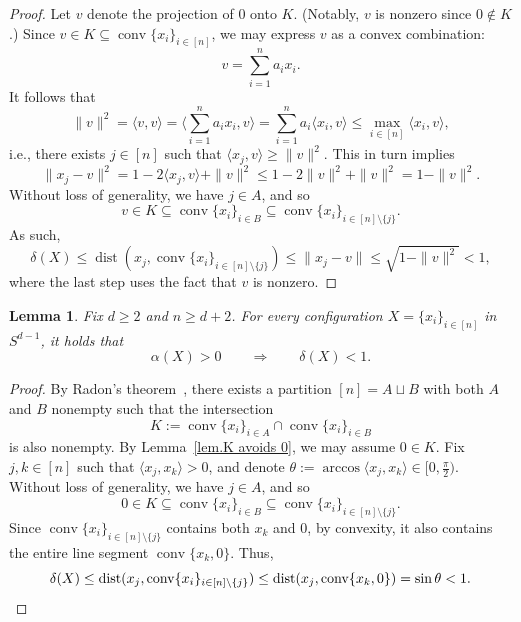 \documentclass{article}
\theoremstyle{plain}
\newtheorem{lemma}[theorem]{Lemma}
\theoremstyle{definition}
\begin{document}
\begin{proof}
Let $v$ denote the projection of $0$ onto $K$.
(Notably, $v$ is nonzero since $0\not\in K$.)
Since $v\in K\subseteq\operatorname{conv}\{x_i\}_{i\in[n]}$, we may express $v$ as a convex combination:
\[
v
=\sum_{i=1}^n a_ix_i.
\]
It follows that
\[
\|v\|^2
=\langle v,v\rangle
=\bigg\langle \sum_{i=1}^n a_ix_i,v\bigg\rangle
=\sum_{i=1}^n a_i\langle x_i,v\rangle
\leq\max_{i\in[n]}\langle x_i,v\rangle,
\]
i.e., there exists $j\in[n]$ such that $\langle x_j,v\rangle\geq\|v\|^2$.
This in turn implies
\[
\|x_j-v\|^2
=1-2\langle x_j,v\rangle+\|v\|^2
\leq 1-2\|v\|^2+\|v\|^2
=1-\|v\|^2.
\]
Without loss of generality, we have $j\in A$, and so
\[
v
\in K
\subseteq \operatorname{conv}\{x_i\}_{i \in B} 
\subseteq \operatorname{conv}\{x_i\}_{i \in [n]\setminus\{j\}}.
\]
As such,
\[
\delta(X)
\leq\operatorname{dist}(x_j,\operatorname{conv}\{x_i\}_{i\in[n]\setminus\{j\}})
\leq\|x_j-v\|
\leq\sqrt{1-\|v\|^2}
<1,
\]
where the last step uses the fact that $v$ is nonzero.
\end{proof}

\begin{lemma}
\label{lem: acute angle implies short distance}
Fix $d\geq 2$ and $n \geq d + 2$. 
For every configuration $X=\{x_i\}_{i\in[n]}$ in $S^{d-1}$, it holds that 
\[
\alpha(X)
> 0
\qquad
\Longrightarrow
\qquad
\delta(X) < 1.
\]
\end{lemma}

\begin{proof}
By Radon's theorem~\cite{Radon:21}, there exists a partition $[n]=A\sqcup B$ with both $A$ and $B$ nonempty such that the intersection
\[
K
:=\operatorname{conv}\{x_i\}_{i\in A} \cap \operatorname{conv}\{x_i\}_{i\in B}
\]
is also nonempty. 
By Lemma~\ref{lem.K avoids 0}, we may assume $0\in K$.
Fix $j,k\in[n]$ such that $\langle x_j, x_k \rangle > 0$, and denote $\theta:=\arccos\langle x_j, x_k \rangle\in[0,\frac{\pi}{2})$.
Without loss of generality, we have $j \in A$, and so
\[
0 
\in K
\subseteq \operatorname{conv}\{x_i\}_{i \in B} 
\subseteq \operatorname{conv}\{x_i\}_{i \in [n]\setminus\{j\}}.
\]
Since $\operatorname{conv}\{x_i\}_{i \in [n]\setminus\{j\}}$ contains both $x_k$ and $0$, by convexity, it also contains the entire line segment $\operatorname{conv}\{x_k,0\}$.
Thus,
\[
\delta(X)
\leq \operatorname{dist}(x_j,\operatorname{conv}\{x_i\}_{i\in[n]\setminus\{j\}})
\leq \operatorname{dist}(x_j,\operatorname{conv}\{x_k,0\})
=\sin\theta
<1.
\qedhere
\]
\end{proof}
\end{document}
